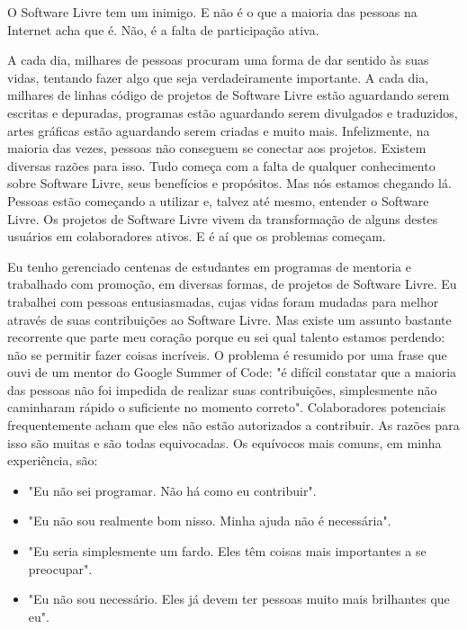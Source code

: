 

\noindent{}O Software Livre tem um inimigo. E não é o que a maioria das pessoas na Internet acha
que é. Não, é a falta de participação ativa.

A cada dia, milhares de pessoas procuram uma forma de dar sentido às suas vidas,
tentando fazer algo que seja verdadeiramente importante. A cada dia, milhares
de linhas código de projetos de Software Livre estão aguardando serem escritas e
depuradas, programas estão aguardando serem divulgados e traduzidos, artes gráficas
estão aguardando serem criadas e muito mais. Infelizmente, na maioria das vezes, pessoas
não conseguem se conectar aos projetos. Existem diversas razões para isso. Tudo começa
com a falta de qualquer conhecimento sobre Software Livre, seus benefícios e propósitos.
Mas nós estamos chegando lá. Pessoas estão começando a utilizar e, talvez até mesmo,
entender o Software Livre. Os projetos de Software Livre vivem da transformação
de alguns destes usuários em colaboradores ativos. E é aí que os problemas começam.

Eu tenho gerenciado centenas de estudantes em programas de mentoria e trabalhado com
promoção, em diversas formas, de projetos de Software Livre. Eu trabalhei com pessoas
entusiasmadas, cujas vidas foram mudadas para melhor através de suas contribuições
ao Software Livre. Mas existe um assunto bastante recorrente que parte meu coração porque
eu sei qual talento estamos perdendo: não se permitir fazer coisas incríveis. O
problema é resumido por uma frase que ouvi de um mentor do Google Summer of Code: "é
difícil constatar que a maioria das pessoas não foi impedida de realizar suas contribuições,
simplesmente não caminharam rápido o suficiente no momento correto". Colaboradores potenciais
frequentemente acham que eles não estão autorizados a contribuir. As razões para isso são
muitas e são todas equivocadas. Os equívocos mais comuns, em minha experiência, são:

\begin{itemize}
 \item "Eu não sei programar. Não há como eu contribuir".
 \item "Eu não sou realmente bom nisso. Minha ajuda não é necessária".
 \item "Eu seria simplesmente um fardo. Eles têm coisas mais importantes a se preocupar".
 \item "Eu não sou necessário. Eles já devem ter pessoas muito mais brilhantes que eu".
\end{itemize}

